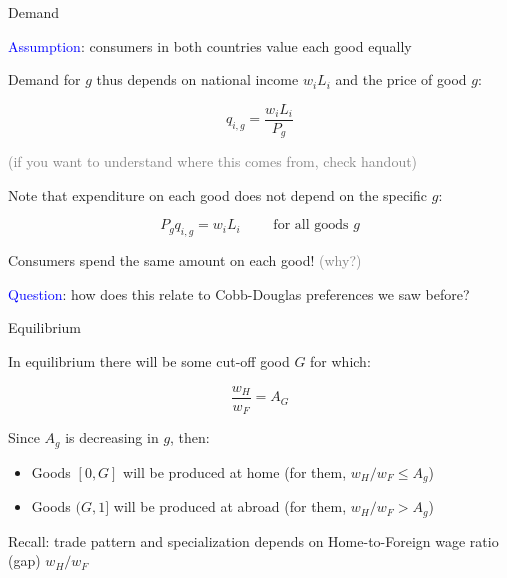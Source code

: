 \documentclass[notes,11pt, aspectratio=169, xcolor=table]{beamer}
\newcommand{\blue}[1]{\textcolor{blue}{#1}}
\newenvironment{wideitemize}{\itemize\addtolength{\itemsep}{10pt}}{\enditemize}
\begin{document}
\begin{frame}{Demand}
\begin{wideitemize}
    \item<1-> \blue{Assumption}: consumers in both countries value each good equally

    \item<2-> Demand for $g$ thus depends on national income $w_iL_i$ and the price of good $g$:

    \begin{equation*}
        q_{i,g} = \frac{w_iL_i}{P_{g}}
    \end{equation*}

    \qquad \textcolor{gray}{(if you want to understand where this comes from, check handout)}

    \item<3-> Note that expenditure on each good does not depend on the specific $g$:

    \begin{equation*}
        P_g q_{i,g} = w_iL_i \qquad \text{ for all goods } g
    \end{equation*}

    \item<4-> Consumers spend the same amount on each good! \textcolor{gray}{(why?)}

    \item<5-> \blue{Question}: how does this relate to Cobb-Douglas preferences we saw before?

    
    \end{wideitemize}
\end{frame}


\begin{frame}{Equilibrium}
\begin{wideitemize}
    \item<1-> In equilibrium there will be some cut-off good $G$ for which:

    \begin{equation*}
        \frac{w_H}{w_F} = A_G
    \end{equation*}

     \item<2-> Since $A_g$ is decreasing in $g$, then:

     \begin{itemize}
         \item Goods $[0,G]$ will be produced at home (for them, $w_H / w_F \le A_g$)
         \item Goods $(G,1]$ will be produced at abroad (for them, $w_H / w_F > A_g$)
        \end{itemize}

        \item<3-> Recall: trade pattern and specialization depends on Home-to-Foreign wage ratio (gap) $w_H/w_F$ 

    \end{wideitemize}
\end{frame}
\end{document}
